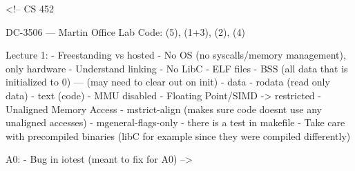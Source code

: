 <!-- CS 452

DC-3506 — Martin Office
Lab Code: (5), (1+3), (2), (4)

Lecture 1:
- Freestanding vs hosted
    - No OS (no syscalls/memory management), only hardware
    - Understand linking 
    - No LibC
- ELF files
    - BSS (all data that is initialized to 0) — (may need to clear out on init)
    - data
    - rodata (read only data)
    - text (code)
- MMU disabled 
    - Floating Point/SIMD -> restricted
    - Unaligned Memory Access
        - mstrict-align (makes sure code doesnt use any unaligned accesses)
        - mgeneral-flags-only
            - there is a test in makefile 
- Take care with precompiled binaries (libC for example since they were compiled differently)

A0:
- Bug in iotest (meant to fix for A0) -->
